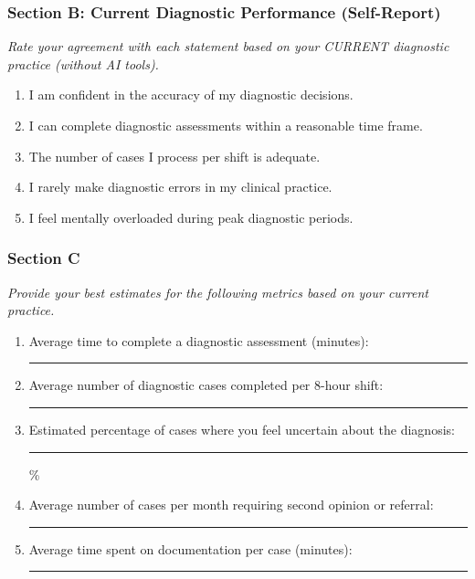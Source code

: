 \subsubsection{Section B: Current Diagnostic Performance (Self-Report)}
\label{sec:pre_performance}

\noindent\textit{Rate your agreement with each statement based on your CURRENT diagnostic practice (without AI tools).}

\begin{enumerate}[label=\textbf{PP\arabic*.}]
    \item I am confident in the accuracy of my diagnostic decisions. \hfill {}    
    \item I can complete diagnostic assessments within a reasonable time frame. \hfill {}    
    \item The number of cases I process per shift is adequate. \hfill {}    
    \item I rarely make diagnostic errors in my clinical practice. \hfill {}    
    \item I feel mentally overloaded during peak diagnostic periods. \hfill {}    
\end{enumerate}

\subsubsection{Section C}
\label{sec:pre_time}

\noindent\textit{Provide your best estimates for the following metrics based on your current practice.}

\begin{enumerate}[label=\textbf{PT\arabic*.}]
    \item Average time to complete a diagnostic assessment (minutes): \rule{2cm}{0.4pt}
    \item Average number of diagnostic cases completed per 8-hour shift: \rule{2cm}{0.4pt}
    \item Estimated percentage of cases where you feel uncertain about the diagnosis: \rule{2cm}{0.4pt}\%
    \item Average number of cases per month requiring second opinion or referral: \rule{2cm}{0.4pt}
    \item Average time spent on documentation per case (minutes): \rule{2cm}{0.4pt}
\end{enumerate}

